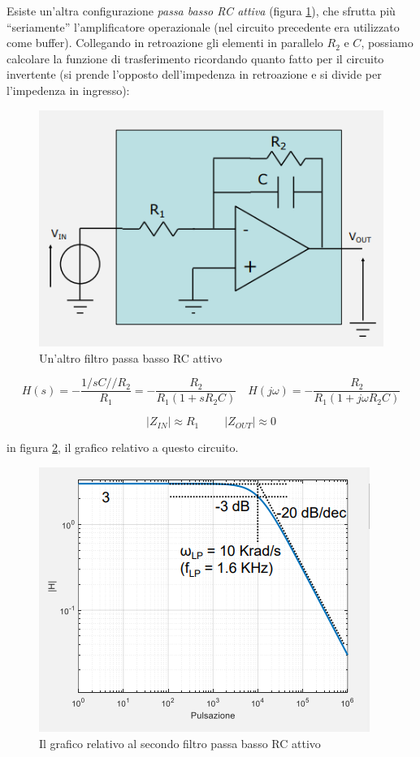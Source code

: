 \documentclass{article}
\begin{document}
\clearpage

Esiste un'altra configurazione \textit{passa basso RC attiva} (figura \ref{Schema_filtro_passa_basso_RC_attivo_bis}), che sfrutta più ``seriamente'' l'amplificatore operazionale (nel circuito precedente era utilizzato come buffer). Collegando in retroazione gli elementi in parallelo $R_2$ e $C$, possiamo calcolare la funzione di trasferimento ricordando quanto fatto per il circuito invertente (si prende l'opposto dell'impedenza in retroazione e si divide per l'impedenza in ingresso):

\begin{figure}[h]
  \centering
  \includegraphics[scale=0.5]{IM_filtro_passa_basso_RC_attivo_bis}
  \caption{Un'altro filtro passa basso RC attivo}
  \label{Schema_filtro_passa_basso_RC_attivo_bis}
\end{figure}

\[H(s) = - \frac{1/sC // R_2}{R_1} = -  \frac{R_2}{R_1 (1 + sR_2 C)} \quad H(j \omega) = - \frac{R_2}{R_1 (1 + j \omega R_2 C)}\]

\[|Z_{IN}| \approx R_1 \;\;\;\;\;\;\;\; |Z_{OUT}| \approx 0\]

in figura \ref{Schema_filtro_passa_basso_RC_attivo_grafici}, il grafico relativo a questo circuito.

\begin{figure}[h]
  \centering
  \includegraphics[scale=0.6]{IM_filtro_passa_basso_RC_attivo_grafici}
  \caption{Il grafico relativo al secondo filtro passa basso RC attivo}
  \label{Schema_filtro_passa_basso_RC_attivo_grafici}
\end{figure}
\end{document}
